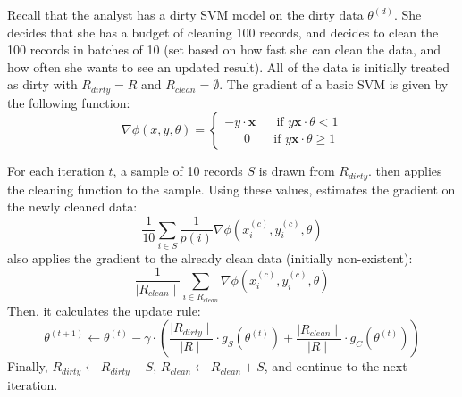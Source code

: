 \begin{example}\label{upex}
Recall that the analyst has a dirty SVM model on the dirty data $\theta^{(d)}$.
She decides that she has a budget of cleaning $100$ records, and decides to clean the 100 records in batches of 10 (set based on how fast she can clean the data, and how often she wants to see an updated result).
All of the data is initially treated as dirty with $R_{dirty} = R$ and $R_{clean} = \emptyset$.
The gradient of a basic SVM is given by the following function:
\[
\nabla\phi(x,y,\theta) =
\begin{cases}      
-y\cdot\boldsymbol{x} ~~~~~~ \text{ if } y\boldsymbol{x}\cdot\theta < 1 \\
~~~~~~~0\ ~~~~~~\text{ if } y\boldsymbol{x}\cdot\theta \geq 1      
\end{cases}
\]

For each iteration $t$, a sample of 10 records $S$ is drawn from $R_{dirty}$.
\sys then applies the cleaning function to the sample.
Using these values, \sys estimates the gradient on the newly cleaned data:
\[
\frac{1}{10} \sum_{i \in S}\frac{1}{p(i)}\nabla\phi(x_i^{(c)},y_i^{(c)},\theta)
\]
\sys also applies the gradient to the already clean data (initially non-existent):
\[
\frac{1}{\mid R_{clean}\mid}\sum_{i \in R_{clean}}\nabla\phi(x_i^{(c)},y_i^{(c)},\theta)
\]
Then, it calculates the update rule:
\[
	\theta^{(t+1)} \leftarrow \theta^{(t)} - \gamma \cdot(\frac{\mid R_{dirty} \mid}{\mid R \mid} \cdot g_S(\theta^{(t)}) + \frac{\mid R_{clean} \mid}{\mid R \mid} \cdot  g_C(\theta^{(t)}))
\] 
Finally, $R_{dirty} \leftarrow R_{dirty} - S$, $R_{clean} \leftarrow R_{clean} + S$, and continue to the next iteration.
\end{example}
